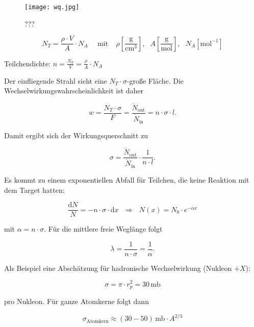 \begin{figure}[H]
	\centering
	\texttt{[image: wq.jpg]}
	\caption{	 ???}
	\label{wq}
\end{figure}


\[ N_T = \frac{\rho\cdot V}{A}\cdot N_A~~~~~~ \text{mit}~~~~~ \rho
\left[\frac{\text{g}}{\text{cm}^3} \right],~~~A\left[\frac{\text{g}}{\text{mol}} \right],~~~N_A\left[\text{mol}^{-1} \right] \] 

Teilchendichte: $n=\frac{N_T}{V}=\frac{\rho}{A}\cdot N_A$

Der einfliegende Strahl sieht eine $N_T\cdot\sigma$-große Fläche. Die
Wechselwirkungswahrscheinlichkeit ist daher

\[w= \frac{N_T\cdot\sigma}{F} = \frac{\dot{N}_\text{out}}{\dot{N}_\text{in}} = n\cdot \sigma \cdot
l. \]

Damit ergibt sich der Wirkungsquerschnitt zu 

\[\sigma =\frac{\dot{N}_\text{out}}{\dot{N}_\text{in}}\cdot \frac{1}{n\cdot l} . \]

Es kommt zu einem exponentiellen Abfall für Teilchen, die keine Reaktion mit dem Target hatten:

\[\frac{\mathrm{d}N}{N} = -n\cdot \sigma\cdot \mathrm{d} x ~~~\Rightarrow~~~ N(x)=N_0\cdot
e^{-\alpha x}
\]

mit $\alpha=n\cdot \sigma$. Für die mittlere freie Weglänge folgt

\[\lambda =\frac{1}{n\cdot\sigma}=\frac{1}{\alpha}.  \]

Als Beispiel eine Abschätzung für hadronische Wechselwirkung (Nukleon $+X$):

\[\sigma = \pi\cdot r_p^2 = 30\,\text{mb} \]

pro Nukleon. Für ganze Atomkerne folgt dann

\[\sigma_\text{Atomkern} \approx (30-50)\,\text{mb}\cdot A^{2/3}\]
